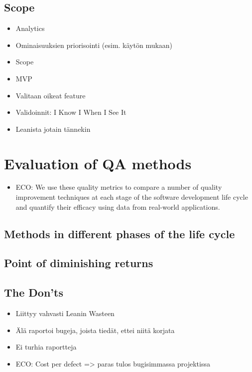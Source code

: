 \documentclass[12pt,a4paper,finnish]{tutthesis}
\begin{document}
 \subsection{Scope}
 
 \begin{itemize}
 
 \item Analytics
 \item Ominaisuuksien priorisointi (esim. käytön mukaan)
 \item Scope
 \item MVP
 \item Valitaan oikeat feature
 \item Validoinnit: I Know I When I See It
 \item Leanista jotain tännekin
 
 \end{itemize}
 
 \section{Evaluation of QA methods}
 
 \begin{itemize}
  
 \item ECO: We use these quality metrics to compare a number of quality improvement techniques at each stage of the software development life cycle and quantify their efficacy using data from real-world applications.
 
 \end{itemize}
 
 \subsection{Methods in different phases of the life cycle}
 
 \subsection{Point of diminishing returns}
 
 \subsection{The Don'ts}
 
 \begin{itemize}
 
 \item Liittyy vahvasti Leanin Wasteen
 \item Älä raportoi bugeja, joista tiedät, ettei niitä korjata
 \item Ei turhia raportteja
 \item ECO: Cost per defect => paras tulos bugisimmassa projektissa
 
 \end{itemize}
 
\end{document}
